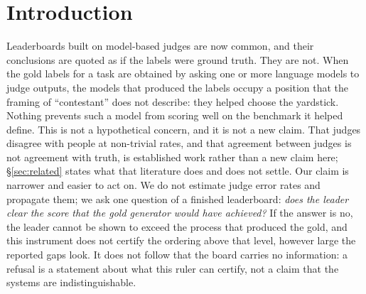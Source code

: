 \documentclass{article}
\begin{document}
\section{Introduction}
\label{sec:intro} Leaderboards built on model-based judges are now common, and their conclusions are quoted as if the labels were ground truth. They are not. When the gold labels for a task are obtained by asking one or more language models to judge outputs, the models that produced the labels occupy a position that the framing of ``contestant'' does not describe: they helped choose the yardstick. Nothing prevents such a model from scoring well on the benchmark it helped define. This is not a hypothetical concern, and it is not a new claim. That judges disagree with people at non-trivial rates, and that agreement between judges is not agreement with truth, is established work rather than a new claim here; \S\ref{sec:related} states what that literature does and does not settle. Our claim is narrower and easier to act on. We do not estimate judge error rates and propagate them; we ask one question of a finished leaderboard:
\emph{does the leader clear the score that the gold generator would have achieved?} If the answer is no, the leader cannot be shown to exceed the process that produced the gold, and this instrument does not certify the ordering above that level, however large the reported gaps look. It does not follow that the board carries no information: a refusal is a statement about what this ruler can certify, not a claim that the systems are indistinguishable.
\end{document}
